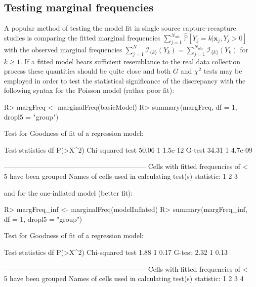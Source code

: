\documentclass[
]{jss}
\newcommand{\1}{\mathcal{I}} \newcommand{\bZero}{\boldsymbol{0}}
\begin{document}
\subsection{Testing marginal
frequencies}\label{testing-marginal-frequencies}

A popular method of testing the model fit in single source
capture-recapture studies is comparing the fitted marginal frequencies
\(\displaystyle\sum_{j=1}^{N_{obs}}\hat{\mathbb{P}}\left[Y_{j}=k|\boldsymbol{x}_{j}, Y_{j} > 0\right]\)
with the observed marginal frequencies
\(\displaystyle\sum_{j=1}^{N}\mathcal{I}_{\{k\}}(Y_{k})=\sum_{j=1}^{N_{obs}}\mathcal{I}_{\{k\}}(Y_{k})\)
for \(k\geq1\). If a fitted model bears sufficient resemblance to the
real data collection process these quantities should be quite close and
both \(G\) and \(\chi^{2}\) tests may be employed in order to test the
statistical significance of the discrepancy with the following
 syntax for the Poisson model (rather poor fit):

\begin{CodeChunk}
\begin{CodeInput}
R> margFreq <- marginalFreq(basicModel)
R> summary(margFreq, df = 1, dropl5 = "group")
\end{CodeInput}
\begin{CodeOutput}
Test for Goodness of fit of a regression model:

                 Test statistics df P(>X^2)
Chi-squared test           50.06  1 1.5e-12
G-test                     34.31  1 4.7e-09

-------------------------------------------------------------- 
Cells with fitted frequencies of < 5 have been grouped 
Names of cells used in calculating test(s) statistic: 1 2 3  
\end{CodeOutput}
\end{CodeChunk}

and for the one-inflated model (better fit):

\begin{CodeChunk}
\begin{CodeInput}
R> margFreq_inf <- marginalFreq(modelInflated)
R> summary(margFreq_inf, df = 1, dropl5 = "group")
\end{CodeInput}
\begin{CodeOutput}
Test for Goodness of fit of a regression model:

                 Test statistics df P(>X^2)
Chi-squared test            1.88  1    0.17
G-test                      2.32  1    0.13

-------------------------------------------------------------- 
Cells with fitted frequencies of < 5 have been grouped 
Names of cells used in calculating test(s) statistic: 1 2 3 4  
\end{CodeOutput}
\end{CodeChunk}
\end{document}
